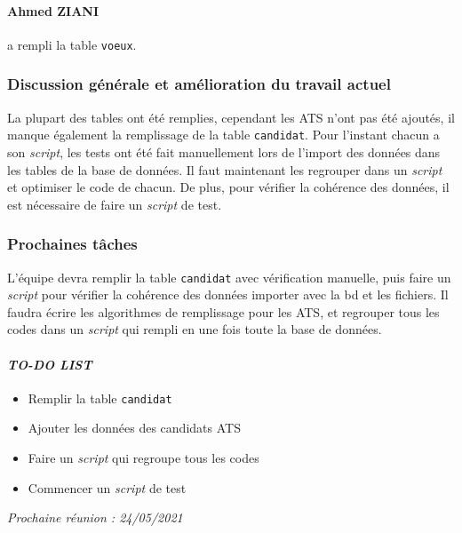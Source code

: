 \paragraph{Ahmed ZIANI} a rempli la table \texttt{voeux}.

\subsubsection*{Discussion générale et amélioration du travail actuel}
La plupart des tables ont été remplies, cependant les ATS n'ont pas été ajoutés, il manque également la remplissage de la table \texttt{candidat}. Pour l'instant chacun a son \textsl{script}, les tests ont été fait manuellement lors de l'import des données dans les tables de la base de données. Il faut maintenant les regrouper dans un \textsl{script} et optimiser le code de chacun. De plus, pour vérifier la cohérence des données, il est nécessaire de faire un \textsl{script} de test.

\subsubsection*{Prochaines tâches}
L'équipe devra remplir la table \texttt{candidat} avec vérification manuelle, puis faire un \textsl{script} pour vérifier la cohérence des données importer avec la bd et les fichiers. Il faudra écrire les algorithmes de remplissage pour les ATS, et regrouper tous les codes dans un \textsl{script} qui rempli en une fois toute la base de données.


\paragraph{\emph{TO-DO LIST}}
\begin{itemize}
    \item Remplir la table \texttt{candidat}
    \item Ajouter les données des candidats ATS
    \item Faire un \textsl{script} qui regroupe tous les codes
    \item Commencer un \textsl{script} de test
    
\end{itemize}

\emph{Prochaine réunion : 24/05/2021}\\

% 